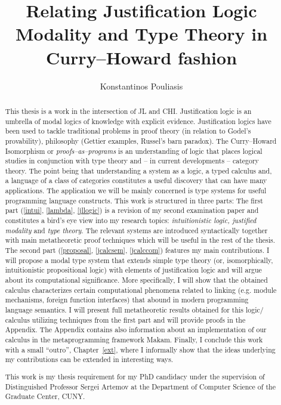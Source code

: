 \documentclass[12pt]{report}
\title{Relating Justification Logic Modality and Type Theory in Curry--Howard fashion}
\author{Konstantinos Pouliasis}
\begin{document}
\maketitle


\begin{abstract}
This thesis is a work in the intersection of \ac{JL} and \ac{CHI}. Justification logic is an umbrella of modal logics of knowledge with explicit evidence. 
Justification logics have been used to tackle traditional problems in proof theory (in relation to Godel's provability), philosophy (Gettier examples, Russel's barn paradox). 
The Curry--Howard Isomorphism or \emph{proofs--as--programs} is an understanding of logic that places logical studies in conjunction with type theory and -- in current developments -- 
category theory. The point being that  understanding a system as a logic, a typed calculus and,  a language of a class of categories constitutes a useful discovery 
that can have many applications.
The application  we will be mainly concerned  is type systems for useful programming language constructs. 
This work  is structured in three parts: 
The first part (\cref{intui}, \cref{lambda}, \cref{jllogic}) is a revision of my second examination paper and constitutes 
a bird's eye view into my 
research topics:  
\emph{intuitionistic logic, justified modality} and \emph{type theory}. 
The relevant systems are introduced syntactically together with main 
 metatheoretic proof techniques which will be useful 
in the rest of the thesis.
The second part (\cref{proposal}, \cref{jcalcsem}, \cref{jcalccom}) 
features my main contributions.
I will propose  
a modal type system that extends simple type theory
 (or, isomorphically, intuitionistic propositional logic) with elements of
 justification logic and will argue about its computational significance. 
 More specifically, I will show  
that the obtained calculus characterizes  certain 
computational phenomena related to linking (e.g. module mechanisms, foreign function interfaces) 
that abound in modern programming language semantics. 
I will present full metatheoretic
results obtained for this logic/ calculus utilizing techniques from the first part 
and will provide proofs in the Appendix. The Appendix contains also information about
an implementation of our calculus in the metaprogramming framework {\sf Makam}.
Finally, I conclude this work with a small ``outro'', Chapter~\ref{ext},
where I informally show that the ideas underlying my contributions 
can be extended in interesting ways.

This work is my thesis requirement for my PhD candidacy under the supervision of Distinguished Professor Sergei Artemov at the Department of 
Computer Science of the Graduate Center, CUNY.
\end{abstract}

\tableofcontents








\begin{appendices}

\end{appendices}




\nocite{Pfenning2009a, Pfenning2009b}




\end{document}
